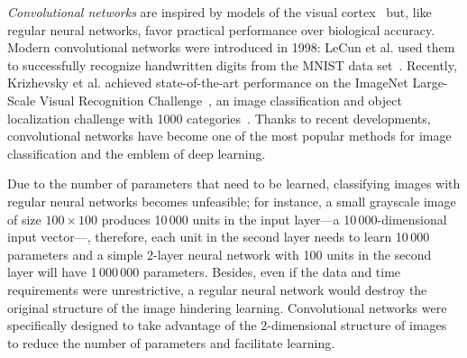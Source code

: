 \emph{Convolutional networks} are inspired by models of the visual cortex~\cite{Fukushima1980} but, like regular neural networks, favor practical performance over biological accuracy.
Modern convolutional networks were introduced in 1998: LeCun et al. used them to successfully recognize handwritten digits from the MNIST data set~\cite{LeCun1998}.
Recently, Krizhevsky et al. achieved state-of-the-art performance on the ImageNet Large-Scale Visual Recognition Challenge~\cite{Krizhevsky2012}, an image classification and object localization challenge with 1000 categories~\cite{Russakovsky2015}. Thanks to recent developments, convolutional networks have become one of the most popular methods for image classification and the emblem of deep learning.


Due to the number of parameters that need to be learned, classifying images with regular neural networks becomes unfeasible; for instance, a small grayscale image of size $100\times100$ produces 10\,000 units in the input layer---a 10\,000-dimensional input vector---, therefore, each unit in the second layer needs to learn 10\,000 parameters and a simple 2-layer neural network with 100 units in the second layer will have 1\,000\,000 parameters. Besides, even if the data and time requirements were unrestrictive, a regular neural network would destroy the original structure of the image hindering learning. Convolutional networks were specifically designed to take advantage of the 2-dimensional structure of images to reduce the number of parameters and facilitate learning.

